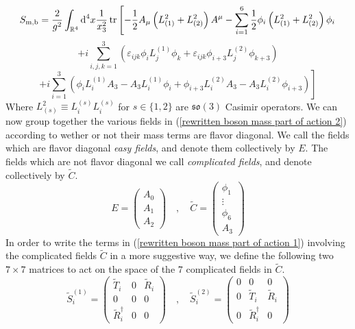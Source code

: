 \newpage
%
%
\begin{equation*}
S_{\text{m,b}}
=
\frac{2}{g^2} \int_{\mathbb{R}^4} \text{d}^4 x \frac{1}{x_3^2}
\tr \left[
- \frac{1}{2} A_\mu \left( L_{(1)}^2 + L_{(2)}^2 \right) A^\mu
- \sum_{i=1}^6 \frac{1}{2} \phi_i \left( L_{(1)}^2 + L_{(2)}^2 \right) \phi_i
\right.
\end{equation*}
%
%
\begin{equation*}
\left.
+ i \sum_{i,j,k=1}^3 \left(
\varepsilon_{ijk} \phi_i L^{(1)}_j \phi_k
+ \varepsilon_{ijk} \phi_{i+3} L^{(2)}_j \phi_{k+3}
\right)
\right.
\end{equation*}
%
%
\begin{equation}\label{rewritten boson mass part of action 2}
\left.
+ i \sum_{i=1}^3 \left(
\phi_i L^{(1)}_i A_3 - A_3 L^{(1)}_i \phi_i
+ \phi_{i+3} L^{(2)}_i A_3 - A_3 L^{(2)}_i \phi_{i+3}
\right)
\right]
\end{equation}
%
%
Where $L^2_{(s)} \equiv L_i^{(s)} L_i^{(s)}$ for $s \in \{ 1,2 \}$ are $\mathfrak{so}(3)$ Casimir operators. We can now group together the various fields in (\ref{rewritten boson mass part of action 2}) according to wether or not their mass terms are flavor diagonal. We call the fields which are flavor diagonal \textit{easy fields}, and denote them collectively by $E$. The fields which are not flavor diagonal we call \textit{complicated fields}, and denote collectively by $\tilde{C}$.
%
%
\begin{equation}
E = \left( \begin{array}{c}
A_0 \\
A_1 \\
A_2 
\end{array} \right)
%
\quad , \quad
%
\tilde{C} = \left( \begin{array}{c}
\phi_1 \\
\vdots \\
\phi_6 \\
A_3 
\end{array} \right)
\end{equation}
%
%
In order to write the terms in (\ref{rewritten boson mass part of action 1}) involving the complicated fields $\tilde{C}$ in a more suggestive way, we define the following two $7 \times 7$ matrices to act on the space of the $7$ complicated fields in $\tilde{C}$.
%
%
\begin{equation}
\tilde{S}^{(1)}_i = \left( \begin{array}{ccc}
\tilde{T}_i & 0 & \tilde{R}_i \\
0 & 0 & 0 \\
\tilde{R}_i^\dagger & 0 & 0
\end{array} \right)
%
\quad , \quad
%
\tilde{S}^{(2)}_i = \left( \begin{array}{ccc}
0 & 0 & 0 \\
0 & \tilde{T}_i & \tilde{R}_i \\
0 & \tilde{R}_i^\dagger & 0
\end{array} \right)
\end{equation}
